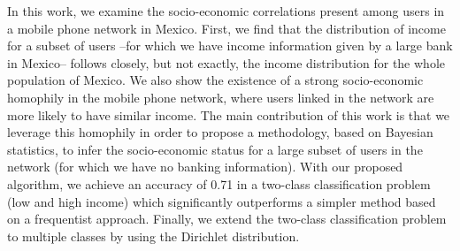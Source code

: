 In this work, we examine the socio-economic correlations present among users in a mobile phone network in Mexico. First, we find that the distribution of income for a subset of users --for which we have income information given by a large bank in Mexico-- follows closely, but not exactly, the income distribution for the whole population of Mexico. We also show the existence of a strong socio-economic homophily in the mobile phone network, where users linked in the network are more likely to have similar income. The main contribution of this work is that we leverage this homophily in order to propose a methodology, based on Bayesian statistics, to infer the socio-economic status for a large subset of users in the network (for which we have no banking information). With our proposed algorithm, we achieve an accuracy of 0.71 in a two-class classification problem (low and high income) which significantly outperforms a simpler method based on a frequentist approach. Finally, we extend the two-class classification problem to multiple classes by using the Dirichlet distribution.
